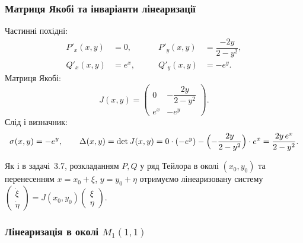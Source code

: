 \subsubsection{Матриця Якобі та інваріанти лінеаризації}

Частинні похідні:
\begin{align*}
P'_x(x,y) &= 0, &\qquad P'_y(x,y) &= \dfrac{-2y}{2-y^2},\\
Q'_x(x,y) &= e^{x}, &\qquad Q'_y(x,y) &= -e^{y}.
\end{align*}
Матриця Якобі:
\begin{equation}\label{eq:lab-jacobian36}
J(x,y)=
\begin{pmatrix}
0 & -\dfrac{2y}{2-y^2}\\[2mm]
e^{x} & -e^{y}
\end{pmatrix}.
\end{equation}
Слід і визначник:
\begin{equation*}
\sigma(x,y)=-e^{y},\qquad
\Delta(x,y)=\det J(x,y)=0\cdot(-e^{y})-\Bigl(-\dfrac{2y}{2-y^2}\Bigr)\cdot e^{x}
=\dfrac{2y\,e^{x}}{2-y^2}.
\end{equation*}

Як і в задачі~3.7, розкладанням $P,Q$ у ряд Тейлора в околі $(x_0,y_0)$ та перенесенням $x=x_0+\xi$, $y=y_0+\eta$ отримуємо лінеаризовану систему
$\begin{pmatrix}\dot\xi\\ \dot\eta\end{pmatrix}=J(x_0,y_0)\begin{pmatrix}\xi\\ \eta\end{pmatrix}$.

\subsubsection{Лінеаризація в околі $M_1(1,1)$}

